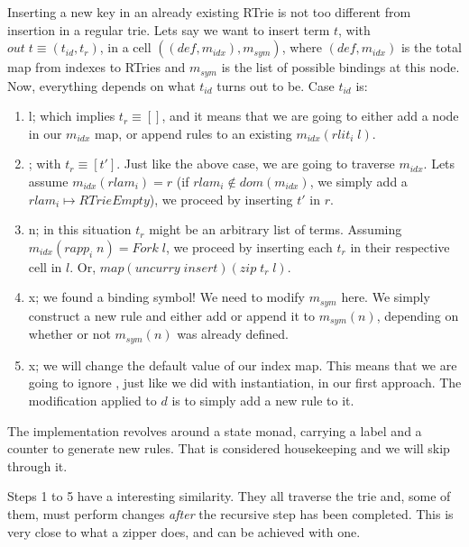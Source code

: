 Inserting a new key in an already existing RTrie is not too different from
insertion in a regular trie. Lets say we want to insert term $t$, with $out\; t \equiv (t_{id} , t_{r})$,
in a cell $((def, m_{idx}) , m_{sym})$, where $(def , m_{idx})$ is the total map from indexes
to RTries and $m_{sym}$ is the list of possible bindings at this node. Now, everything
depends on what $t_{id}$ turns out to be. Case $t_{id}$ is:
\begin{enumerate}
  \item {} l; which implies $t_{r} \equiv []$, and it means that we are going
        to either add a  node in our $m_{idx}$ map, or append rules to an existing
        $m_{idx}(rlit_i\; l)$.
        
  \item {}; with $t_{r} \equiv [t']$. Just like the above case, we are going
        to traverse $m_{idx}$. Lets assume $m_{idx}(rlam_i) = r$ (if $rlam_i \notin dom(m_{idx})$, we simply
        add a $ rlam_i \mapsto RTrieEmpty$), we proceed by inserting $t'$ in $r$.  
  
  \item {} n; in this situation $t_{r}$ might be an arbitrary list of terms. 
        Assuming $m_{idx}(rapp_i\; n) = Fork\; l$, we proceed by inserting each $t_{r}$
        in their respective cell in $l$. Or, $map (uncurry\;insert) (zip\;t_{r}\;l)$.
  
  \item {} x; we found a binding symbol! We need to modify $m_{sym}$ here. 
        We simply construct a new rule and either add or append it to $m_{sym}(n)$, depending
        on whether or not $m_{sym}(n)$ was already defined. 
         
  \item {} x; we will change the default value of our index map. This means that
        we are going to ignore , just like we did with instantiation, in our
        first approach. The modification applied to $d$ is to simply add a new rule to it.
\end{enumerate}

The implementation revolves around a state monad, carrying a label and a counter to generate
new rules. That is considered housekeeping and we will skip through it.


Steps 1 to 5 have a interesting similarity. They all traverse the trie and, some of them, must
perform changes \emph{after} the recursive step has been completed. This is very close
to what a zipper does, and can be achieved with one.

